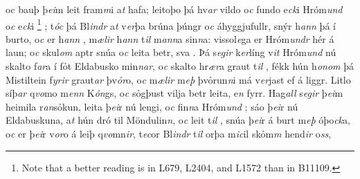 oc bauþ þ\textit{ei}m leit fram\textit{m}i a\textit{t} hafa; leitoþo þá   hv\textit{ar}  vildo o\textit{c} fundo e\textit{ck}i Hróm\textit{und} o\textit{c}  e\textit{ck}i   \footnote{
	Note that a better reading is in L679, L2404, and L1572 than in B11109.}  ; t\textit{óc} þá Bl\textit{indr} a\textit{t} v\textit{er}þa  brúna þúngr  o\textit{c} áhyggjufullr, snýr h\textit{ann} þá í burto, o\textit{c} er h\textit{ann}  , m\textit{ælir} h\textit{ann} t\textit{il} m\textit{ann}a sin\textit{n}a: vissol\textit{e}ga er
Hróm\textit{undr} hér á laun; o\textit{c} skul\textit{om}  aptr   snúa o\textit{c} leita betr,  
 sva  . 
Þá s\textit{egir} k\textit{er}líng v\textit{it} Hróm\textit{und} nú
skalto f\textit{ar}a í fỏt Eldabusko min\textit{n}\textit{ar},
o\textit{c} skalto hr\textit{ær}a graut t\textit{il} , fékk  hún h\textit{onom} þá Mistiltein f\textit{yrir}
graut\textit{ar} þv\textit{ỏr}o, 
o\textit{c} m\textit{ælir} m\textit{eþ} þvỏrun\textit{n}i  má v\textit{er}jast ef á liggr.
Litlo síþ\textit{ar} q\textit{vo}mo m\textit{enn} K\textit{ón}gs, 
o\textit{c} sỏgþust vilja betr leita, e\textit{n} fyrr. 
Hag\textit{all} s\textit{egir} þ\textit{ei}m heimila r\textit{an}sỏkun, leita
þ\textit{ei}r  nú lengi, o\textit{c} fin\textit{n}a
 Hróm\textit{und} ; 
sáo þ\textit{ei}r nú  Eldabuskuna, a\textit{t} hún dró til  Möndulin\textit{n}, o\textit{c} leit  t\textit{il} , 
snúa þ\textit{ei}r   á burt m\textit{eþ}  óþo\textit{ck}a, o\textit{c} er þ\textit{ei}r v\textit{or}o á   leiþ q\textit{vo}mn\textit{ir}, t\textit{ec}or Bl\textit{indr} t\textit{il} orþa   m\textit{ic}il skỏm\textit{m} hend\textit{ir} o\textit{ss}, 
